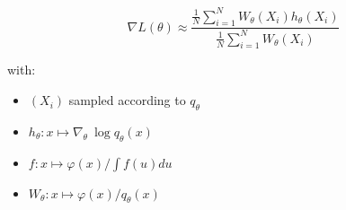 $$\nabla L(\theta) \approx \frac{ \frac 1 N \displaystyle\sum_{i=1}^N W_\theta(X_i) h_\theta(X_i)}
{\frac 1 N \displaystyle\sum_{i=1}^N W_\theta(X_i)}$$


with:
\begin{itemize}
\item $(X_i)$  sampled according to $q_\theta$
\item $h_\theta : x \mapsto \nabla_\theta \ \log q_\theta(x)$ 
\item $f : x \mapsto \varphi(x) / \int f(u)du$
\item $W_\theta : x \mapsto \varphi(x) / q_\theta(x)$
\end{itemize}


